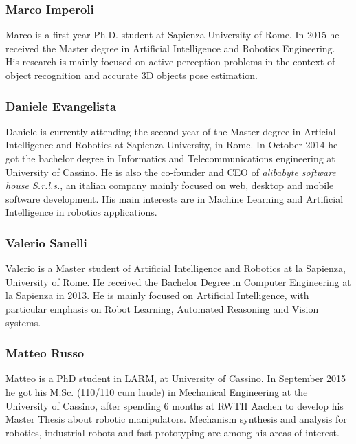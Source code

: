\documentclass[conference]{IEEEtran}
\begin{document}
\subsubsection*{Marco Imperoli}
Marco is a first year Ph.D. student at Sapienza University of Rome. 
In 2015 he received the Master degree in Artificial Intelligence and Robotics Engineering. 
His research is mainly focused on active perception problems in the context of object recognition and accurate 3D objects pose estimation. 

\subsubsection*{Daniele Evangelista}
Daniele is currently attending the second year of the Master degree in Articial Intelligence and Robotics at Sapienza University, in Rome. 
In October 2014 he got the bachelor degree in Informatics and Telecommunications engineering at University of Cassino. 
He is also the co-founder and CEO of \emph{alibabyte software house S.r.l.s.}, an italian company mainly focused on web, desktop and mobile 
software development. His main interests are in Machine Learning and Artificial Intelligence in robotics applications.

\subsubsection*{Valerio Sanelli}
Valerio is a Master student of Artificial Intelligence and Robotics at la Sapienza, University of Rome.
He received the Bachelor Degree in Computer Engineering at la Sapienza in 2013.
He is mainly focused on Artificial Intelligence, with particular  emphasis on Robot Learning, Automated Reasoning and Vision systems.

\subsubsection*{Matteo Russo}
Matteo is a PhD student in LARM, at University of Cassino. In September 2015 he got his M.Sc. (110/110 cum laude) in Mechanical Engineering 
at the University of Cassino, after spending 6 months at RWTH Aachen to develop his Master Thesis about robotic manipulators. 
Mechanism synthesis and analysis for robotics, industrial robots and fast prototyping are among his areas of interest.
\end{document}
